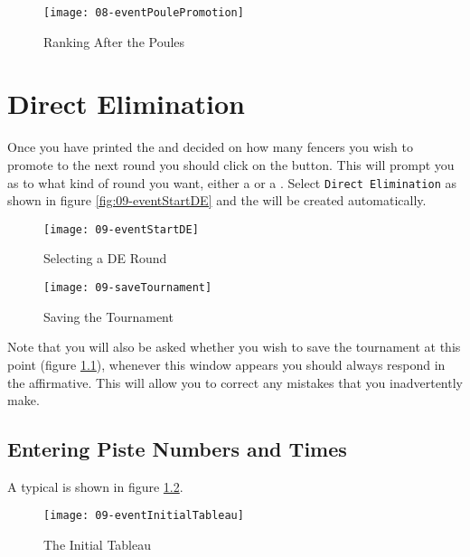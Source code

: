 \documentclass[a4paper,11pt]{memoir}
\begin{document}
\begin{figure}[!ht]
 \centering
 \texttt{[image: 08-eventPoulePromotion]}
 \caption{Ranking After the Poules} \label{fig:08-eventPoulePromotion}
\end{figure}

\chapter{Direct Elimination}
Once you have printed the  and decided on how many fencers you wish to promote to the next round you should click on the  button.  This will prompt you as to what kind of round you want, either a  or a . Select \texttt{Direct Elimination} as shown in figure \ref{fig:09-eventStartDE} and the  will be created automatically. 

\begin{figure}[!ht]
 \centering
 \begin{minipage}{0.4\textwidth}
  \centering
  \texttt{[image: 09-eventStartDE]}
  \caption{Selecting a DE Round} \label{fig:09-eventStartDE}
 \end{minipage}
 \hfill
  \begin{minipage}{0.4\textwidth}
  \centering
  \texttt{[image: 09-saveTournament]}
  \caption{Saving the Tournament} \label{fig:09-saveTournament}
 \end{minipage}
\end{figure}

Note that you will also be asked whether you wish to save the tournament at this point (figure \ref{fig:09-saveTournament}), whenever this window appears you should always respond in the affirmative. This will allow you to correct any mistakes that you inadvertently make.
      
\section{Entering Piste Numbers and Times}

A typical  is shown in figure \ref{fig:09-eventInitialTableau}.

\begin{figure}[!ht]
 \centering
 \texttt{[image: 09-eventInitialTableau]}
 \caption{The Initial Tableau} \label{fig:09-eventInitialTableau}
\end{figure}
 
\end{document}
